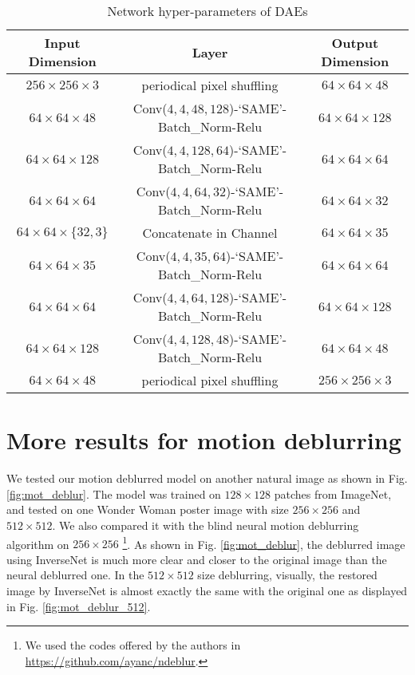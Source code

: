 \documentclass[10pt,twocolumn,letterpaper]{article}
\begin{document}
\begin{appendices}
\begin{table*}[h]
\centering
\caption{Network hyper-parameters of DAEs}
\begin{tabular}{ |c|c|c| } 
\hline
Input Dimension    & Layer                                           & Output Dimension \\
\hline
$256 \times 256 \times 3$      & periodical pixel shuffling                     & $64 \times  64 \times 48$ \\
$64 \times 64 \times 48$       & Conv($4,4,48,128$)-`SAME'-Batch\_Norm-Relu       & $64 \times 64 \times 128$ \\
$64 \times 64 \times 128$      & Conv($4,4,128,64$)-`SAME'-Batch\_Norm-Relu       & $64 \times 64 \times  64 $ \\
$64 \times 64 \times 64$       & Conv($4,4,64,32$)-`SAME'-Batch\_Norm-Relu        & $64 \times 64 \times 32$ \\
$64 \times 64 \times \{32,3\}$ & Concatenate in Channel                         & $64 \times 64 \times 35 $ \\
$64 \times 64 \times 35$       & Conv($4,4,35,64$)-`SAME'-Batch\_Norm-Relu        & $64 \times 64 \times 64 $\\
$64 \times 64 \times 64 $      & Conv($4,4,64,128$)-`SAME'-Batch\_Norm-Relu       & $64 \times 64 \times 128$ \\
$64 \times 64 \times 128 $     & Conv($4,4,128,48$)-`SAME'-Batch\_Norm-Relu       & $64 \times 64 \times 48$ \\
$64 \times 64 \times 48  $     & periodical pixel shuffling                     & $256 \times 256 \times 3$ \\
\hline
\end{tabular}\label{tab:dae}
\end{table*}

\section{More results for motion deblurring}

We tested our motion deblurred model on another natural image as shown in Fig. \ref{fig:mot_deblur}. 
The model was trained on $128 \times 128$ patches from ImageNet, and tested on one Wonder Woman poster image 
with size $256\times 256$ and $512 \times 512$. 
We also compared it with the blind neural motion deblurring algorithm \cite{chakrabarti2016neural} on $256\times 256$
\footnote{We used the codes offered by the authors in \url{https://github.com/ayanc/ndeblur}.}.
As shown in Fig. \ref{fig:mot_deblur}, the deblurred image using InverseNet is much more clear and 
closer to the original image than the neural deblurred one. %
In the $512 \times 512$ size deblurring, visually, the restored image by InverseNet is almost exactly the same
with the original one as displayed in Fig. \ref{fig:mot_deblur_512}.


\end{appendices}
\end{document}
